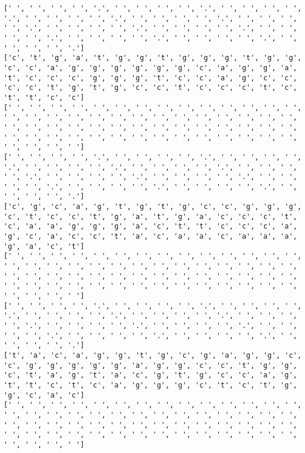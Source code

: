 \documentclass{article}
\begin{document}
\begin{Verbatim}
[' ', ' ', ' ', ' ', '.', ' ', ' ', ' ', ' ', '.', ' ', ' ', ' ', ' ', '.', ' ', ' ', ' ', ' ', '.', ' ', ' ', ' ', ' ', '.', ' ', ' ', ' ', ' ', '.', ' ', ' ', ' ', ' ', '.', ' ', ' ', ' ', ' ', '.', ' ', ' ', ' ', ' ', '.', ' ', ' ', ' ', ' ', '.', ' ', ' ', ' ', ' ', '.', ' ', ' ', ' ', ' ', '.']
['c', 't', 'g', 'a', 't', 'g', 'g', 't', 'g', 'g', 'g', 't', 'g', 'g', 'c', 'c', 'a', 'g', 'g', 'g', 'g', 'g', 'g', 'c', 'a', 'g', 'g', 'a', 't', 'c', 'c', 'c', 'g', 'g', 'g', 't', 'c', 'c', 'a', 'g', 'c', 'c', 'c', 'c', 't', 'g', 't', 'g', 'c', 'c', 't', 'c', 'c', 'c', 't', 'c', 't', 't', 'c', 'c']
[' ', ' ', ' ', ' ', ' ', ' ', ' ', ' ', ' ', ' ', ' ', ' ', ' ', ' ', ' ', ' ', ' ', ' ', ' ', ' ', ' ', ' ', ' ', ' ', ' ', ' ', ' ', ' ', ' ', ' ', ' ', ' ', ' ', ' ', ' ', ' ', ' ', ' ', ' ', ' ', ' ', ' ', ' ', ' ', ' ', ' ', ' ', ' ', ' ', ' ', ' ', ' ', ' ', ' ', ' ', ' ', ' ', ' ', ' ', ' ']
[' ', ' ', ' ', ' ', '.', ' ', ' ', ' ', ' ', '.', ' ', ' ', ' ', ' ', '.', ' ', ' ', ' ', ' ', '.', ' ', ' ', ' ', ' ', '.', ' ', ' ', ' ', ' ', '.', ' ', ' ', ' ', ' ', '.', ' ', ' ', ' ', ' ', '.', ' ', ' ', ' ', ' ', '.', ' ', ' ', ' ', ' ', '.', ' ', ' ', ' ', ' ', '.', ' ', ' ', ' ', ' ', '.']
['c', 'g', 'c', 'a', 'g', 't', 'g', 't', 'g', 'c', 'c', 'g', 'g', 'g', 'c', 't', 'c', 'c', 't', 'g', 'a', 't', 'g', 'a', 'c', 'c', 'c', 't', 'c', 'a', 'a', 'g', 'g', 'g', 'a', 'c', 't', 't', 'c', 'c', 'c', 'a', 'g', 'c', 'a', 'c', 'c', 't', 'a', 'c', 'a', 'a', 'c', 'a', 'a', 'a', 'g', 'a', 'c', 't']
[' ', ' ', ' ', ' ', ' ', ' ', ' ', ' ', ' ', ' ', ' ', ' ', ' ', ' ', ' ', ' ', ' ', ' ', ' ', ' ', ' ', ' ', ' ', ' ', ' ', ' ', ' ', ' ', ' ', ' ', ' ', ' ', ' ', ' ', ' ', ' ', ' ', ' ', ' ', ' ', ' ', ' ', ' ', ' ', ' ', ' ', ' ', ' ', ' ', ' ', ' ', ' ', ' ', ' ', ' ', ' ', ' ', ' ', ' ', ' ']
[' ', ' ', ' ', ' ', '.', ' ', ' ', ' ', ' ', '.', ' ', ' ', ' ', ' ', '.', ' ', ' ', ' ', ' ', '.', ' ', ' ', ' ', ' ', '.', ' ', ' ', ' ', ' ', '.', ' ', ' ', ' ', ' ', '.', ' ', ' ', ' ', ' ', '.', ' ', ' ', ' ', ' ', '.', ' ', ' ', ' ', ' ', '.', ' ', ' ', ' ', ' ', '.', ' ', ' ', ' ', ' ', '.']
['t', 'a', 'c', 'a', 'g', 'g', 't', 'g', 'c', 'g', 'a', 'g', 'g', 'c', 'c', 'g', 'g', 'g', 'g', 'g', 'a', 'g', 'g', 'c', 'c', 't', 'g', 'g', 'c', 't', 'a', 'g', 't', 'a', 'c', 'g', 't', 'g', 'c', 'c', 'a', 'g', 't', 't', 'c', 't', 'c', 'a', 'g', 'g', 'g', 'c', 't', 'c', 't', 'g', 'g', 'c', 'a', 'c']
[' ', ' ', ' ', ' ', ' ', ' ', ' ', ' ', ' ', ' ', ' ', ' ', ' ', ' ', ' ', ' ', ' ', ' ', ' ', ' ', ' ', ' ', ' ', ' ', ' ', ' ', ' ', ' ', ' ', ' ', ' ', ' ', ' ', ' ', ' ', ' ', ' ', ' ', ' ', ' ', ' ', ' ', ' ', ' ', ' ', ' ', ' ', ' ', ' ', ' ', ' ', ' ', ' ', ' ', ' ', ' ', ' ', ' ', ' ', ' ']

\end{Verbatim}
\end{document}
